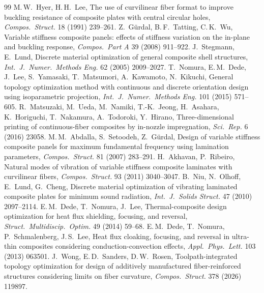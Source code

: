 \begin{thebibliography}{99}\small
 M.\,W.\ Hyer, H.\,H.\ Lee, The use of curvilinear fiber format to improve
buckling resistance of composite plates with central circular holes, \emph{Compos.\ Struct.}
18 (1991) 239--261.
 Z.\ G\"urdal, B.\,F.\ Tatting, C.\,K.\ Wu, Variable stiffness composite panels:
effects of stiffness variation on the in-plane and buckling response, \emph{Compos.\ Part A}
39 (2008) 911--922.
 J.\ Stegmann, E.\ Lund, Discrete material optimization of general
composite shell structures, \emph{Int.\ J.\ Numer.\ Methods Eng.} 62 (2005) 2009--2027.
 T.\ Nomura, E.\,M.\ Dede, J.\ Lee, S.\ Yamasaki, T.\ Matsumori, A.\ Kawamoto,
N.\ Kikuchi, General topology optimization method with continuous and discrete orientation
design using isoparametric projection, \emph{Int.\ J.\ Numer.\ Methods Eng.} 101 (2015)
571--605.
 R.\ Matsuzaki, M.\ Ueda, M.\ Namiki, T.-K.\ Jeong, H.\ Asahara, K.\
Horiguchi, T.\ Nakamura, A.\ Todoroki, Y.\ Hirano, Three-dimensional printing of
continuous-fiber composites by in-nozzle impregnation, \emph{Sci.\ Rep.} 6 (2016) 23058.
\bibitem{abdalla2007} M.\,M.\ Abdalla, S.\ Setoodeh, Z.\ G\"urdal, Design of variable stiffness
composite panels for maximum fundamental frequency using lamination parameters,
\emph{Compos.\ Struct.} 81 (2007) 283--291.
 H.\ Akhavan, P.\ Ribeiro, Natural modes of vibration of variable stiffness
composite laminates with curvilinear fibers, \emph{Compos.\ Struct.} 93 (2011) 3040--3047.
\bibitem{niu2010} B.\ Niu, N.\ Olhoff, E.\ Lund, G.\ Cheng, Discrete material optimization of
vibrating laminated composite plates for minimum sound radiation, \emph{Int.\ J.\ Solids
Struct.} 47 (2010) 2097--2114.
 E.\,M.\ Dede, T.\ Nomura, J.\ Lee, Thermal-composite design optimization for
heat flux shielding, focusing, and reversal, \emph{Struct.\ Multidiscip.\ Optim.} 49 (2014)
59--68.
 E.\,M.\ Dede, T.\ Nomura, P.\ Schmalenberg, J.\,S.\ Lee, Heat flux cloaking,
focusing, and reversal in ultra-thin composites considering conduction-convection effects,
\emph{Appl.\ Phys.\ Lett.} 103 (2013) 063501.
 J.\ Wong, E.\,D.\ Sanders, D.\,W.\ Rosen, Toolpath-integrated topology
optimization for design of additively manufactured fiber-reinforced structures considering
limits on fiber curvature, \emph{Compos.\ Struct.} 378 (2026) 119897.

\end{thebibliography}
